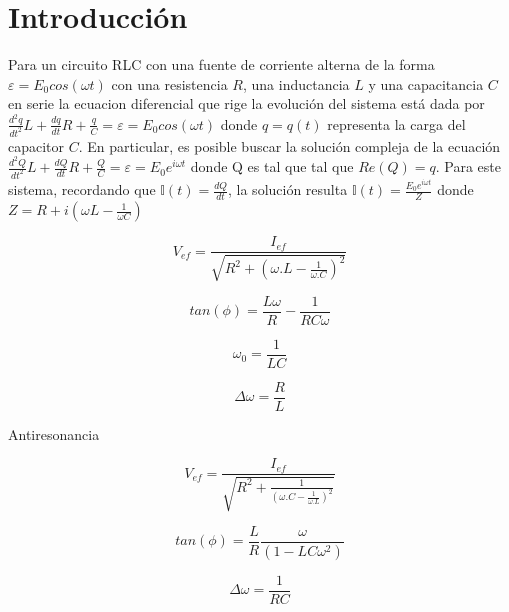 \documentclass[11pt,a4paper]{article}
\begin{document}
\section{Introducción}\label{sec:intro}

Para un circuito RLC con una fuente de corriente alterna de la forma $\varepsilon = E_{0}cos(\omega t)$ con una resistencia $R$, una inductancia $L$ y una capacitancia $C$ en serie la ecuacion diferencial que rige la evolución del sistema está dada por $\frac{d^2q}{dt^2}L+\frac{dq}{dt}R+\frac{q}{C} = \varepsilon = E_{0}cos(\omega t)$ donde $q = q(t)$ representa la carga del capacitor $C$. En particular, es posible buscar la solución compleja de la ecuación $\frac{d^2Q}{dt^2}L+\frac{dQ}{dt}R+\frac{Q}{C} = \varepsilon = E_{0}e^{i\omega t}$ donde Q es tal que tal que $Re(Q) = q$. Para este sistema, recordando que $\mathbb{I}(t) = \frac{dQ}{dt}$, la solución resulta $\mathbb{I}(t) = \frac{E_0e^{i\omega t}}{Z}$ donde $Z = R +i(\omega L-\frac{1}{\omega C})$

\begin{equation}
V_{ef} = \frac{I_{ef}}{\sqrt{R^2 + (\omega.L - \frac{1}{\omega.C})^2}}
\label{eq:1}
\end{equation}

\begin{equation}
tan(\phi) = \frac{L\omega}{R} - \frac{1}{RC\omega} 
\label{eq:2}
\end{equation}

\begin{equation}
\omega_{0}= \frac{1}{LC}
\label{eq:F_res}
\end{equation}

\begin{equation}
\Delta\omega = \frac{R}{L}
\label{deltaomega}
\end{equation}

Antiresonancia

\begin{equation}
V_{ef} = \frac{I_{ef}}{\sqrt{R^2 + \frac{1}{(\omega.C - \frac{1}{\omega.L})^2}}}
\label{eq:3}
\end{equation}

\begin{equation}
tan(\phi) = \frac{L}{R}\frac{\omega}{(1- LC\omega^2)} 
\label{eq:4}
\end{equation}

\begin{equation}
\Delta\omega = \frac{1}{RC}
\label{deltaomega2}
\end{equation}
\end{document}
